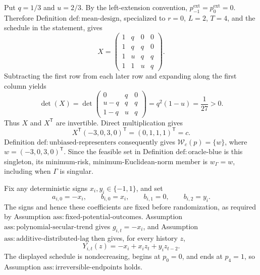 Put \(q=1/3\) and \(u=2/3\).  By the left-extension convention, \(p^{\mathrm{ext}}_{-1}=p^{\mathrm{ext}}_0=0\).  Therefore Definition \(\mathrm{def:mean\text{-}design}\), specialized to \(r=0\), \(L=2\), \(T=4\), and the schedule in the statement, gives
\[
X=
\begin{pmatrix}
1&q&0&0\\
1&q&q&0\\
1&u&q&q\\
1&1&u&q
\end{pmatrix}.
\]
Subtracting the first row from each later row and expanding along the first column yields
\[
\det(X)
=\det\!\begin{pmatrix}
0&q&0\\
u-q&q&q\\
1-q&u&q
\end{pmatrix}
=q^2(1-u)=\frac{1}{27}>0.
\]
Thus \(X\) and \(X^{\mathsf T}\) are invertible.  Direct multiplication gives
\[
X^{\mathsf T}(-3,0,3,0)^{\mathsf T}
=(0,1,1,1)^{\mathsf T}=c.
\]
Definition \(\mathrm{def:unbiased\text{-}representers}\) consequently gives
\(\mathcal W_c(p)=\{w\}\), where \(w=(-3,0,3,0)^{\mathsf T}\).  Since the feasible set in Definition \(\mathrm{def:oracle\text{-}blue}\) is this singleton, its minimum-risk, minimum-Euclidean-norm member is \(w_\Gamma=w\), including when \(\Gamma\) is singular.

Fix any deterministic signs \(x_i,y_i\in\{-1,1\}\), and set
\[
a_{i,0}=-x_i,\qquad b_{i,0}=x_i,\qquad b_{i,1}=0,
\qquad b_{i,2}=y_i.
\tag{1}
\]
The signs and hence these coefficients are fixed before randomization, as required by Assumption \(\mathrm{ass:fixed\text{-}potential\text{-}outcomes}\).  Assumption \(\mathrm{ass:polynomial\text{-}secular\text{-}trend}\) gives \(g_{i,t}=-x_i\), and Assumption \(\mathrm{ass:additive\text{-}distributed\text{-}lag}\) then gives, for every history \(z\),
\[
Y_{i,t}(z)=-x_i+x_i z_t+y_i z_{t-2}.
\tag{2}
\]
The displayed schedule is nondecreasing, begins at \(p_0=0\), and ends at \(p_4=1\), so Assumption \(\mathrm{ass:irreversible\text{-}endpoints}\) holds.

